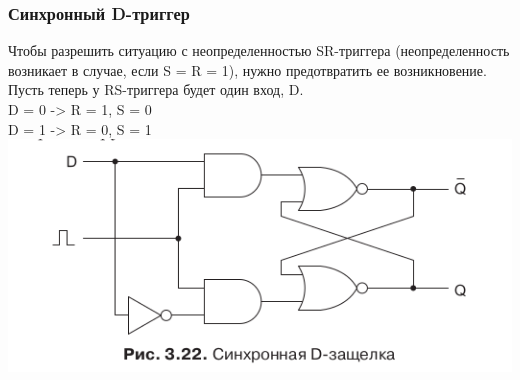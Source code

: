 \documentclass[12pt, a4paper]{article}
\begin{document}
\subsubsection{Синхронный D-триггер}
Чтобы разрешить ситуацию с неопределенностью SR-триггера (неопределенность
возникает в случае, если S = R = 1), нужно предотвратить ее возникновение.\\
Пусть теперь у RS-триггера будет один вход, D.\\
D = 0 -> R = 1, S = 0\\
D = 1 -> R = 0, S = 1\\
\includegraphics[scale=0.6]{./images/3_22.png}
\end{document}
